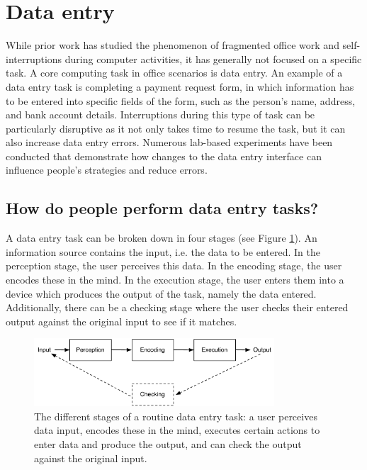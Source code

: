\section{Data entry}
While prior work has studied the phenomenon of fragmented office work and self-interruptions during computer activities, it has generally not focused on a specific task. A core computing task in office scenarios is data entry. An example of a data entry task is completing a payment request form, in which information has to be entered into specific fields of the form, such as the person’s name, address, and bank account details. Interruptions
during this type of task can be particularly disruptive as it not only takes time to resume the task, but it can also increase data entry errors. Numerous lab-based experiments have been conducted that demonstrate how changes to the data entry interface can influence people’s strategies and reduce errors.

\subsection{How do people perform data entry tasks?}
A data entry task can be broken down in four stages (see Figure \ref{fig:ch2_hip}). An information source contains the input, i.e. the data to be entered. In the perception stage, the user perceives this data. In the encoding stage, the user encodes these in the mind. In the execution stage, the user enters them into a device which produces the output of the task, namely the data entered. Additionally, there can be a checking stage where the user checks their entered output against the original input to see if it matches.

\begin{figure}[!ht]
\centering
\includegraphics[width=0.8\textwidth]{images/background/HIP.pdf}
\caption[Different stages of a data entry task]{The different stages of a routine data entry task: a user perceives data input, encodes these in the mind, executes certain actions to enter data and produce the output, and can check the output against the original input.}
\vspace{-3pt}
\label{fig:ch2_hip}
\end{figure}

